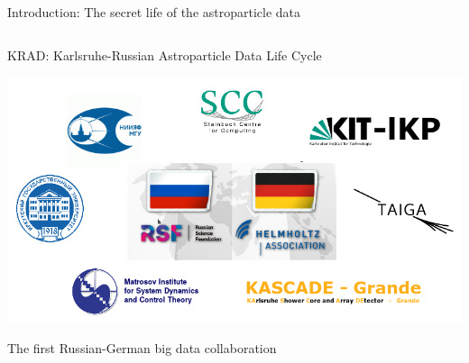 \begin{frame}{Introduction: The secret life of the astroparticle data}
\begin{columns}
\begin{column}[t]{0.53\textwidth}
  \end{column}
\end{columns}
  \footnotesize{}
\end{frame}

\begin{frame}{\textcolor{kit-green100}{KRAD}: \textcolor{kit-green100}{K}arlsruhe-\textcolor{kit-green100}{R}ussian \textcolor{kit-green100}{A}stroparticle \textcolor{kit-green100}{D}ata Life Cycle}
\vspace{-2em}
\begin{center}
  \includegraphics[width=1\linewidth]{pics/Collab.png}
\end{center}
\vspace{-2\parsep}
The first Russian-German big data collaboration
\end{frame}

